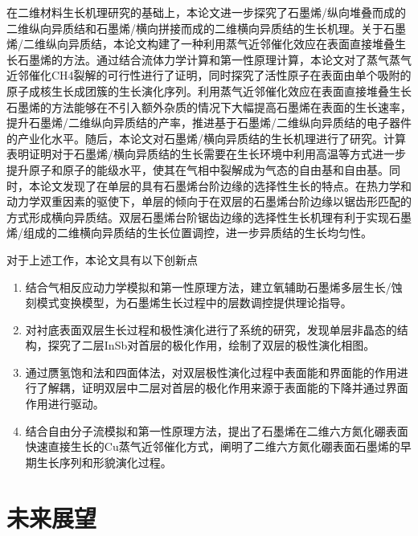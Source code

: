 在二维材料生长机理研究的基础上，本论文进一步探究了石墨烯/纵向堆叠而成的二维纵向异质结和石墨烯/横向拼接而成的二维横向异质结的生长机理。关于石墨烯/二维纵向异质结，本论文构建了一种利用蒸气近邻催化效应在表面直接堆叠生长石墨烯的方法。通过结合流体力学计算和第一性原理计算，本论文对了蒸气蒸气近邻催化CH4裂解的可行性进行了证明，同时探究了活性原子在表面由单个吸附的原子成核生长成团簇的生长演化序列。利用蒸气近邻催化效应在表面直接堆叠生长石墨烯的方法能够在不引入额外杂质的情况下大幅提高石墨烯在表面的生长速率，提升石墨烯/二维纵向异质结的产率，推进基于石墨烯/二维纵向异质结的电子器件的产业化水平。随后，本论文对石墨烯/横向异质结的生长机理进行了研究。计算表明证明对于石墨烯/横向异质结的生长需要在生长环境中利用高温等方式进一步提升原子和原子的能级水平，使其在气相中裂解成为气态的自由基和自由基。同时，本论文发现了在单层的具有石墨烯台阶边缘的选择性生长的特点。在热力学和动力学双重因素的驱使下，单层的倾向于在双层的石墨烯台阶边缘以锯齿形匹配的方式形成横向异质结。双层石墨烯台阶锯齿边缘的选择性生长机理有利于实现石墨烯/组成的二维横向异质结的生长位置调控，进一步异质结的生长均匀性。

对于上述工作，本论文具有以下创新点\chinesecolon
\begin{enumerate}[label=（\arabic*）,wide]
    \item 结合气相反应动力学模拟和第一性原理方法，建立氧辅助石墨烯多层生长/蚀刻模式变换模型，为石墨烯生长过程中的层数调控提供理论指导。
    \item 对衬底表面双层生长过程和极性演化进行了系统的研究，发现单层非晶态的结构，探究了二层InSb对首层的极化作用，绘制了双层的极性演化相图。
    \item 通过赝氢饱和法和四面体法，对双层极性演化过程中表面能和界面能的作用进行了解耦，证明双层中二层对首层的极化作用来源于表面能的下降并通过界面作用进行驱动。
    \item 结合自由分子流模拟和第一性原理方法，提出了石墨烯在二维六方氮化硼表面快速直接生长的Cu蒸气近邻催化方式，阐明了二维六方氮化硼表面石墨烯的早期生长序列和形貌演化过程。
\end{enumerate}
\section{未来展望}

